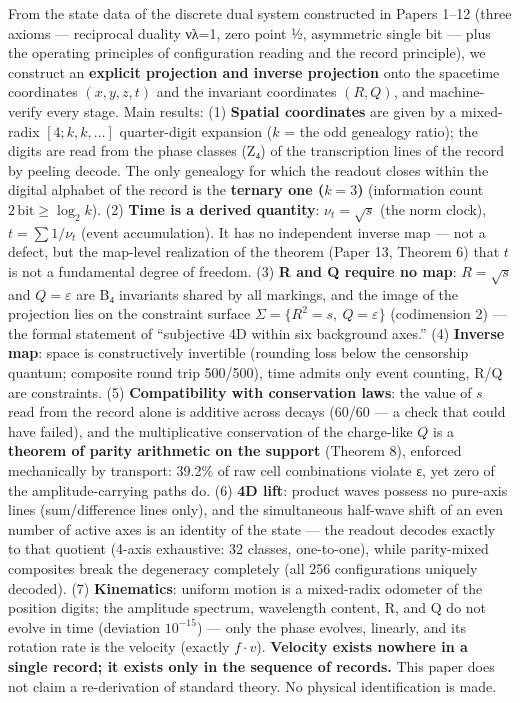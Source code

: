 \documentclass[
]{ltjsarticle}
\begin{document}
From the state data of the discrete dual system constructed in Papers
1--12 (three axioms --- reciprocal duality νλ=1, zero point ½,
asymmetric single bit --- plus the operating principles of configuration
reading and the record principle), we construct an \textbf{explicit
projection and inverse projection} onto the spacetime coordinates
\((x,y,z,t)\) and the invariant coordinates \((R,Q)\), and
machine-verify every stage. Main results: (1) \textbf{Spatial
coordinates} are given by a mixed-radix \([4;k,k,\dots]\) quarter-digit
expansion (\(k\) = the odd genealogy ratio); the digits are read from
the phase classes (Z₄) of the transcription lines of the record by
peeling decode. The only genealogy for which the readout closes within
the digital alphabet of the record is the \textbf{ternary one
(\(k{=}3\))} (information count \(2\,\mathrm{bit}\ge\log_2 k\)). (2)
\textbf{Time is a derived quantity}: \(\nu_t=\sqrt{s}\) (the norm
clock), \(t=\sum 1/\nu_t\) (event accumulation). It has no independent
inverse map --- not a defect, but the map-level realization of the
theorem (Paper 13, Theorem 6) that \(t\) is not a fundamental degree of
freedom. (3) \textbf{R and Q require no map}: \(R=\sqrt{s}\) and
\(Q=\varepsilon\) are B₄ invariants shared by all markings, and the
image of the projection lies on the constraint surface
\(\Sigma=\{R^2=s,\ Q=\varepsilon\}\) (codimension 2) --- the formal
statement of ``subjective 4D within six background axes.'' (4)
\textbf{Inverse map}: space is constructively invertible (rounding loss
below the censorship quantum; composite round trip 500/500), time admits
only event counting, R/Q are constraints. (5) \textbf{Compatibility with
conservation laws}: the value of \(s\) read from the record alone is
additive across decays (60/60 --- a check that could have failed), and
the multiplicative conservation of the charge-like \(Q\) is a
\textbf{theorem of parity arithmetic on the support} (Theorem 8),
enforced mechanically by transport: 39.2\% of raw cell combinations
violate ε, yet zero of the amplitude-carrying paths do. (6) \textbf{4D
lift}: product waves possess no pure-axis lines (sum/difference lines
only), and the simultaneous half-wave shift of an even number of active
axes is an identity of the state --- the readout decodes exactly to that
quotient (4-axis exhaustive: 32 classes, one-to-one), while parity-mixed
composites break the degeneracy completely (all 256 configurations
uniquely decoded). (7) \textbf{Kinematics}: uniform motion is a
mixed-radix odometer of the position digits; the amplitude spectrum,
wavelength content, R, and Q do not evolve in time (deviation
\(10^{-15}\)) --- only the phase evolves, linearly, and its rotation
rate is the velocity (exactly \(f\cdot v\)). \textbf{Velocity exists
nowhere in a single record; it exists only in the sequence of records.}
This paper does not claim a re-derivation of standard theory. No
physical identification is made.
\end{document}
